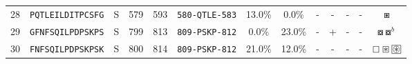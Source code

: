 \begin{tabular}{rcccccccccccc}
28 &  \texttt{PQTLEILDITPCSFG} &       S &    579 &   593 &                \texttt{{\scriptsize 580-}QTLE{\scriptsize -583}} &                          13.0\% &                            0.0\% &          - &           - &          - &           - &                                                                                           $ \boxast $ \\
29 &  \texttt{GFNFSQILPDPSKPS} &       S &    799 &   813 &                \texttt{{\scriptsize 809-}PSKP{\scriptsize -812}} &                           0.0\% &                           23.0\% &          - &           + &          - &           - &                                                                           $ \boxcircle \boxcircle^b $ \\
30 &  \texttt{FNFSQILPDPSKPSK} &       S &    800 &   814 &                \texttt{{\scriptsize 809-}PSKP{\scriptsize -812}} &                          21.0\% &                           12.0\% &          - &           - &          - &           - &                                 $ \boxempty \boxast \setlength{\fboxsep}{0.5pt} \boxed{\circledast} $ \\
\bottomrule
\end{tabular}
